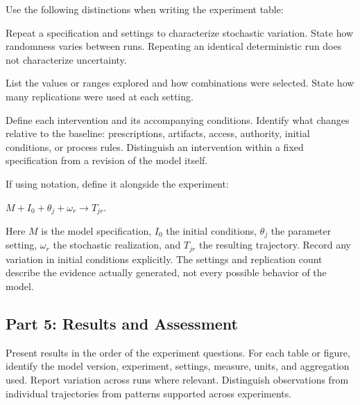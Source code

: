 \documentclass[11pt,a4paper]{article}
\newenvironment{fitdisplay}{\par\medskip\noindent\begin{lrbox}{\displaybox}$\displaystyle}{%
$\end{lrbox}\makebox[\linewidth][c]{\ifdim\wd\displaybox>\linewidth\resizebox{\linewidth}{!}{\usebox{\displaybox}}\else\usebox{\displaybox}\fi}\par\medskip}
\begin{document}
Use the following distinctions when writing the experiment table:
\begin{description}[style=nextline,leftmargin=0pt,itemsep=5pt]
\item[Replications] Repeat a specification and settings to characterize stochastic variation. State how randomness varies between runs. Repeating an identical deterministic run does not characterize uncertainty.
\item[Parameter sweeps] List the values or ranges explored and how combinations were selected. State how many replications were used at each setting.
\item[Scenarios] Define each intervention and its accompanying conditions. Identify what changes relative to the baseline: prescriptions, artifacts, access, authority, initial conditions, or process rules. Distinguish an intervention within a fixed specification from a revision of the model itself.
\end{description}

If using notation, define it alongside the experiment:
\begin{fitdisplay}
M+I_0+\theta_j+\omega_r\rightarrow T_{jr}.
\end{fitdisplay}
Here $M$ is the model specification, $I_0$ the initial conditions, $\theta_j$ the parameter setting, $\omega_r$ the stochastic realization, and $T_{jr}$ the resulting trajectory. Record any variation in initial conditions explicitly. The settings and replication count describe the evidence actually generated, not every possible behavior of the model.

\subsection{Part 5: Results and Assessment}

Present results in the order of the experiment questions. For each table or figure, identify the model version, experiment, settings, measure, units, and aggregation used. Report variation across runs where relevant. Distinguish observations from individual trajectories from patterns supported across experiments.
\end{document}
